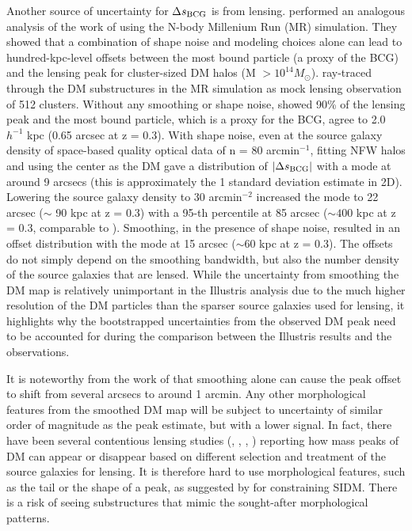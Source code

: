 Another source of uncertainty for $\Delta s_{\rm BCG}$ is from lensing. 
\cite{Dietrich2012} performed an analogous analysis of the work of \cite{Oguri2010} 
using the N-body Millenium Run (MR) simulation.
They showed that a combination of shape noise and modeling choices 
alone can lead to hundred-kpc-level offsets between the most bound particle 
(a proxy of the BCG) and the lensing peak for cluster-sized DM halos 
(M $> 10^{14 }M_\odot$).  
\cite{Dietrich2012} ray-traced through the DM substructures in the MR simulation 
as mock lensing observation of 512 clusters.  
Without any smoothing or shape noise, \cite{Dietrich2012} showed 
90\% of the lensing peak and the 
most bound particle, which is a proxy for the BCG, agree to 2.0 $h^{-1}$ kpc
(0.65 arcsec at z = 0.3). 
With shape noise,
even at the source galaxy density of space-based quality optical data of n = 80
arcmin$^{-1}$, fitting NFW halos and using the center as the DM gave a 
distribution of $|\Delta s_{\rm BCG}|$ with a mode at around 9 arcsecs (this is
approximately the 1 standard deviation estimate in 2D). 
Lowering the source galaxy density to 30 arcmin$^{-2}$ increased the mode
to 22 arcsec ($\sim$ 90 kpc at z = 0.3) with a 95-th percentile at 85 arcsec 
($\sim 400$ kpc at z = 0.3, comparable to \citealt{Oguri2010}). 
Smoothing, in the presence of shape noise,
resulted in an offset distribution with the mode at
15 arcsec ($\sim 60$ kpc at z = 0.3). 
The offsets do not simply depend on the smoothing bandwidth, 
but also the number density of the source galaxies that are lensed. 
While the uncertainty from smoothing the DM map is
relatively unimportant in the Illustris analysis due to the much higher resolution 
of the DM particles than the sparser source galaxies used for lensing, it
highlights why the bootstrapped uncertainties from the observed
DM peak need to be accounted for during the comparison between the
Illustris results and the observations.


It is noteworthy from the work of \cite{Dietrich2012} that 
smoothing alone can cause the peak offset to shift from several arcsecs to
around 1 arcmin.
Any other morphological features from the smoothed DM map will be subject 
to uncertainty of similar order of magnitude as the peak
estimate, but with a lower signal. 
In fact, there have been several contentious lensing studies (\citealt{Clowe2012},
\citealt{Jee2014b}, \citealt{Wittman2014}, \citealt{Cook2012})
reporting how mass peaks of DM can appear or disappear based on
different selection and treatment of the source galaxies for lensing. 
It is therefore hard to use morphological features, such as the tail or the shape 
of a peak,
as suggested by \cite{Kahlhoefer14} for constraining SIDM.
There is a risk of seeing substructures that mimic the sought-after 
morphological patterns. 


